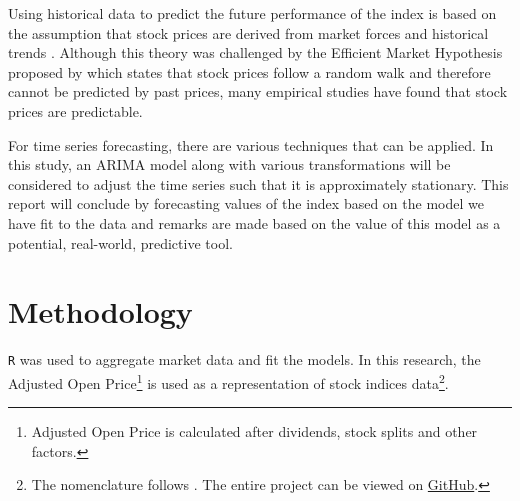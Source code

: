 \documentclass[12pt, centerh1]{article}
\begin{document}
Using historical data to predict the future performance of the index is based on the assumption that stock prices are derived from market forces and historical trends \citep{levy1967relative}. Although this theory was challenged by the Efficient Market Hypothesis proposed by \citet{malkiel2003efficient} which states that stock prices follow a random walk and therefore cannot be predicted by past prices, many empirical studies have found that stock prices are predictable.

For time series forecasting, there are various techniques that can be applied. In this study, an ARIMA model along with various transformations will be considered to adjust the time series such that it is approximately stationary. This report will conclude by forecasting values of the index based on the model we have fit to the data and remarks are made based on the value of this model as a potential, real-world, predictive tool.

\section{Methodology}


\texttt{R} \citep{R} was used to aggregate market data and fit the models.  In this research, the Adjusted Open Price\footnote{Adjusted Open Price is calculated after dividends, stock splits and other factors.} is used as a representation of stock indices data\footnote{The nomenclature follows \citet{cryer2008time}. The entire project can be viewed on \href{https://github.com/grantwforsythe/ARIMA-Model}{GitHub}.}.
\end{document}
